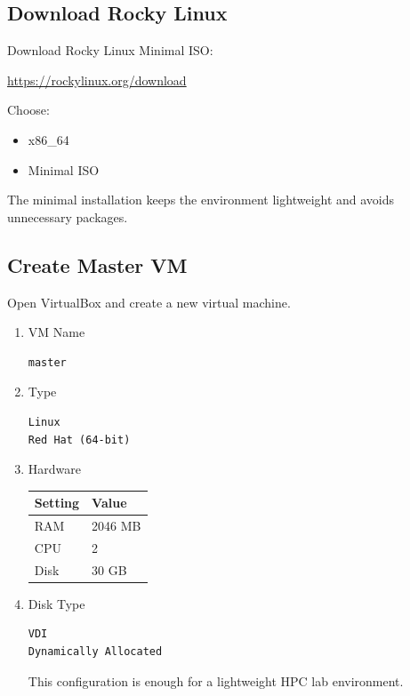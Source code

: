 \documentclass[11pt]{article}
\begin{document}
\subsection{Download Rocky Linux}
\label{sec:org3caa480}

Download Rocky Linux Minimal ISO:

\url{https://rockylinux.org/download}

Choose:

\begin{itemize}
\item x86\_64
\item Minimal ISO
\end{itemize}

The minimal installation keeps the environment lightweight and avoids
unnecessary packages.
\subsection{Create Master VM}
\label{sec:orga3fa560}

Open VirtualBox and create a new virtual machine.
\begin{enumerate}
\item VM Name
\label{sec:org0962fae}

\begin{verbatim}
master
\end{verbatim}
\item Type
\label{sec:orgdd39ade}

\begin{verbatim}
Linux
Red Hat (64-bit)
\end{verbatim}
\item Hardware
\label{sec:org0733d64}

\begin{center}
\begin{tabular}{ll}
Setting & Value\\
\hline
RAM & 2046 MB\\
CPU & 2\\
Disk & 30 GB\\
\end{tabular}
\end{center}
\item Disk Type
\label{sec:org21e41a7}

\begin{verbatim}
VDI
Dynamically Allocated
\end{verbatim}

This configuration is enough for a lightweight HPC lab environment.
\end{enumerate}
\end{document}
